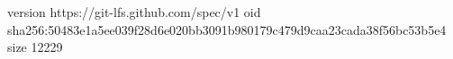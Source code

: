 version https://git-lfs.github.com/spec/v1
oid sha256:50483e1a5ee039f28d6e020bb3091b980179c479d9caa23cada38f56bc53b5e4
size 12229
